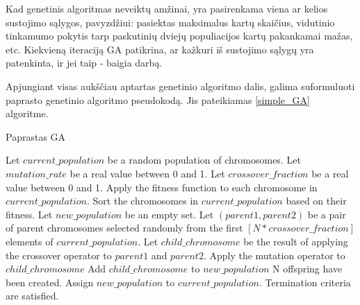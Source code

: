 \documentclass{VUMIFInfKursinis}
\begin{document}
Kad genetinis algoritmas neveiktų amžinai, yra pasirenkama viena ar kelios sustojimo sąlygos, pavyzdžiui: pasiektas maksimalus
kartų skaičius, vidutinio tinkamumo pokytis tarp paskutinių dviejų populiacijos kartų pakankamai mažas, etc.
Kiekvieną iteraciją GA patikrina, ar kažkuri iš sustojimo sąlygų yra patenkinta, ir jei taip - baigia darbą.

Apjungiant visas aukščiau aptartas genetinio algoritmo dalis, galima suformuluoti paprasto genetinio algoritmo pseudokodą.
Jis pateikiamas \ref{simple_GA} algoritme.

\begin{algorithm}[H]
  \caption{Paprastas GA}\label{simple_GA}
  \begin{algorithmic}
    \State Let $current\_population$ be a random population of chromosomes.
    \State Let $mutation\_rate$ be a real value between 0 and 1.
    \State Let $crossover\_fraction$ be a real value between 0 and 1.
    \Repeat
      \State Apply the fitness function to each chromosome in $current\_population$.
      \State Sort the chromosomes in $current\_population$ based on their fitness. %
      \State Let $new\_population$ be an empty set.
      \Repeat
        \State Let $(parent1, parent2)$ be a pair of parent chromosomes selected randomly from the first $[N * crossover\_fraction]$ elements of $current\_population$.
        \State Let $child\_chromosome$ be the result of applying the crossover operator to $parent1$ and $parent2$.
          \State Apply the mutation operator to $child\_chromosome$
        \EndIf
        \State Add $child\_chromosome$ to $new\_population$
      \Until N offspring have been created.
      \State Assign $new\_population$ to $current\_population$.
    \Until Termination criteria are satisfied.
  \end{algorithmic}
\end{algorithm}
\end{document}

